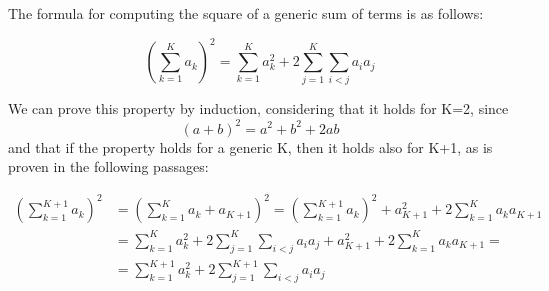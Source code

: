 \documentclass[12pt]{article}
\begin{document}
The formula for computing the square of a generic sum of terms is as follows:

$$\left(\sum_{k=1}^{K}a_{k}\right)^{2}=\sum_{k=1}^{K}a_{k}^{2}+2\sum_{j=1}^{K}\sum_{i<j}a_{i}a_{j}$$

We can prove this property by induction, considering that it holds for K=2, since \[(a+b)^2 = a^2 + b^2 + 2ab\] and that if the property holds for a generic K, then it holds also for K+1, as is proven in the following passages:

\begin{equation}
\begin{aligned}\left(\sum_{k=1}^{K+1}a_{k}\right)^{2} & =\left(\sum_{k=1}^{K}a_{k}+a_{K+1}\right)^{2}=\left(\sum_{k=1}^{K+1}a_{k}\right)^{2}+a_{K+1}^{2}+2\sum_{k=1}^{K}a_{k}a_{K+1}\\
& =\sum_{k=1}^{K}a_{k}^{2}+2\sum_{j=1}^{K}\sum_{i<j}a_{i}a_{j}+a_{K+1}^{2}+2\sum_{k=1}^{K}a_{k}a_{K+1}=\\
& =\sum_{k=1}^{K+1}a_{k}^{2}+2\sum_{j=1}^{K+1}\sum_{i<j}a_{i}a_{j}
\end{aligned}
\end{equation}
\end{document}
